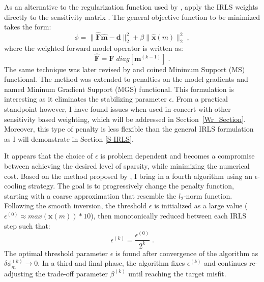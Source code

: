 As an alternative to the regularization function used by \cite{ LastKubik83}, \cite{Gorodnitsky97} apply the IRLS weights directly to the sensitivity matrix . The general objective function to be minimized takes the form:
\begin{equation}\label{eq:Lp_Jweighted}
 \phi = \|\mathbf{ \hat F \hat m - d }\|_2^{2} + \beta \|\mathbf{ \hat x}(m) \|_2^{2} \;,
\end{equation}
where the weighted forward model operator is written as:
\begin{equation}\label{eq:m_weighted}
 \mathbf{ \hat F = F}\;diag[\mathbf{m}^{(k-1)}]\;.
\end{equation}
The same technique was later revised by \cite{Portniaguine1999, PortniaguineZhdanov02} and coined Minimum Support (MS) functional.
The method was extended to penalties on the model gradients and named Mininum Gradient Support (MGS) functional.
This formulation is interesting as it eliminates the stabilizing parameter $\epsilon$.
From a practical standpoint however, I have found issues when used in concert with other sensitivity based weighting, which will be addressed in Section~\ref{Wr_Section}. 
Moreover, this type of penalty is less flexible than the general IRLS formulation as I will demonstrate in Section \ref{S-IRLS}. 

It appears that the choice of $\epsilon$ is problem dependent and becomes a compromise between achieving the desired level of sparsity, while minimizing the numerical cost.
Based on the method proposed by \cite{Chartrand07}, I bring in a fourth algorithm using an $\epsilon$-cooling strategy.
The goal is to progressively change the penalty function, starting with a coarse approximation that resemble the $l_2$-norm function.
Following the smooth inversion, the threshold $\epsilon$ is initialized as a large value ($\epsilon^{(0)} \approx max \left(\mathbf{x}(m) \right)*10$), then monotonically reduced between each IRLS step such that:
\begin{equation}
\epsilon^{(k)}=\frac{\epsilon^{(0)}}{2^k}\;.
\end{equation}
The optimal threshold  parameter $\epsilon$ is found after convergence of the algorithm as $\delta \phi^{(k)}_m \rightarrow 0$.
In a third and final phase, the algorithm fixes $\epsilon^{(k)}$ and continues re-adjusting the trade-off parameter $\beta^{(k)}$ until reaching the target misfit.


